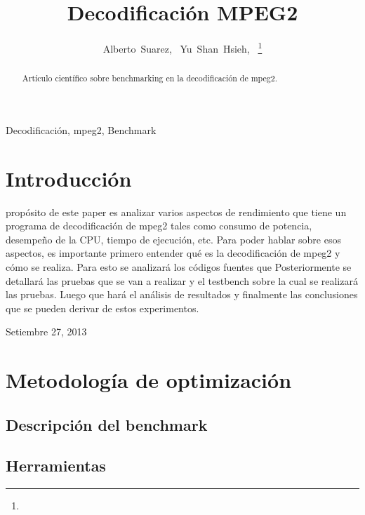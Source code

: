 \documentclass[journal]{IEEEtran}
\begin{document}
%
\title{Decodificaci\'{o}n MPEG2}
\author{Alberto~Suarez,~
        Yu~Shan~Hsieh,~%
\thanks{}%
}
\maketitle

\begin{abstract}
Art\'{i}culo cient\'{i}fico sobre benchmarking en la decodificaci\'{o}n de mpeg2.
\end{abstract}

\begin{IEEEkeywords}
Decodificaci\'{o}n, mpeg2, Benchmark
\end{IEEEkeywords}

\section{Introducci\'{o}n}
 prop\'{o}sito de este paper es analizar varios aspectos de rendimiento que tiene un programa de decodificaci\'{o}n de mpeg2 tales como consumo de potencia, desempe\~{n}o de la CPU, tiempo de ejecuci\'{o}n, etc. 
Para poder hablar sobre esos aspectos, es importante primero entender qu\'{e} es la decodificaci\'{o}n de mpeg2 y c\'{o}mo se realiza. Para esto se analizar\'{a} los c\'{o}digos fuentes que  Posteriormente se detallar\'{a} las pruebas que se van a realizar y el testbench sobre la cual se realizar\'{a} las pruebas. Luego que har\'{a} el an\'{a}lisis de resultados y finalmente las conclusiones que se pueden derivar de estos experimentos.


\hfill Setiembre 27, 2013

\section{Metodolog\'{i}a de optimizaci\'{o}n}

\subsection{Descripci\'{o}n del benchmark}

\subsection{Herramientas}
\end{document}
